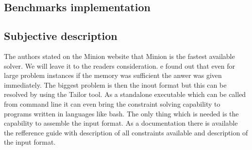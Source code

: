 \subsection{Benchmarks implementation}

\subsection{Subjective description}
The authors stated on the Minion website that Minion is the fastest available solver.
We will leave it to the readers consideration. e found out that even for large problem 
instances if the memory was sufficient the anwer was given immediately. The biggest 
problem is then the inout format but this can be resolved by using the Tailor tool.
As a standalone executable which can be called from command line it can even bring 
the constraint solving capability to programs written in languages like bash. The only
thing which is needed is the capability to assemble the input format. As a documentation 
there is available the refference guide with description of all constraints available and
description of the input format.